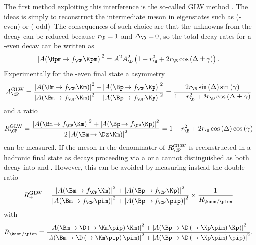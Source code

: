 The first method exploiting this interference is the so-called GLW method \cite{GLW_1, GLW_2}.
The ideas is simply to reconstruct the intermediate \D meson in \CP eigenstates such as \Kp\Km (\CP-even) or \KS\piz (\CP-odd).
The consequences of such choice are that the unknowns from the \D decay can be reduced because $r_\D=1$ and $\Delta_\D=0$, so the total decay rates for \eg a \CP-even \D decay can be written as
\begin{equation}
\left|A\!\left(\Bpm\!\to f_{\CP}\Kpm\right)\right|^2=A^2A_\D^2\left(1+r_\B^2+2r_\B\cos\left(\Delta\pm\gamma\right)\right).\label{eq:totDecRateGLW}
\end{equation}
Experimentally for the \CP-even final state a \CP asymmetry
\begin{equation}
A_{\CP}^{\text{GLW}}=\frac{\left|A\!\left(\Bm\!\to f_{\CP}\Km\right)\right|^2-\left|A\!\left(\Bp\!\to f_{\CP}\Kp\right)\right|^2}{\left|A\!\left(\Bm\!\to f_{\CP}\Km\right)\right|^2+\left|A\!\left(\Bp\!\to f_{\CP}\Kp\right)\right|^2}=\frac{2r_\B\sin\left(\Delta\right)\sin\left(\gamma\right)}{1+r_\B^2+2r_\B\cos\left(\Delta\pm\gamma\right)}\label{eq:ACP_GLW}
\end{equation}
and a \CP ratio
\begin{equation}
R_{\CP}^{\text{GLW}}=\frac{\left|A\!\left(\Bm\!\to f_{\CP}\Km\right)\right|^2+\left|A\!\left(\Bp\!\to f_{\CP}\Kp\right)\right|^2}{2\left|A\!\left(\Bm\!\to\Dz\Km\right)\right|^2}=1+r_\B^2+2r_\B\cos\left(\Delta\right)\cos\left(\gamma\right)\label{eq:RCP_GLW}
\end{equation}
can be measured. If the \D meson in the denominator of $R_{\CP}^{\text{GLW}}$ is reconstructed in a hadronic final state as \kaon\pion decays proceeding via a \Dz or a \Dzb cannot distinguished as both decay into \Kp\pim and \Km\pip. However, this can be avoided by measuring instead the double ratio
\begin{equation}
R_{+}^{\text{GLW}}=\frac{\left|A\!\left(\Bm\!\to f_{\CP}\Km\right)\right|^2+\left|A\!\left(\Bp\!\to f_{\CP}\Kp\right)\right|^2}{\left|A\!\left(\Bm\!\to f_{\CP}\pim\right)\right|^2+\left|A\!\left(\Bp\!\to f_{\CP}\pip\right)\right|^2}\times\frac{1}{R_{\kaon/\pion}}
\end{equation}
with
\begin{equation}
R_{\kaon/\pion}=\frac{\left|A\!\left(\Bm\!\to \D\left(\to\Km\pip\right)\Km\right)\right|^2+\left|A\!\left(\Bp\!\to \D\left(\to\Kp\pim\right)\Kp\right)\right|^2}{\left|A\!\left(\Bm\!\to \D\left(\to\Km\pip\right)\pim\right)\right|^2+\left|A\!\left(\Bp\!\to \D\left(\to\Kp\pim\right)\pip\right)\right|^2}.
\end{equation}

